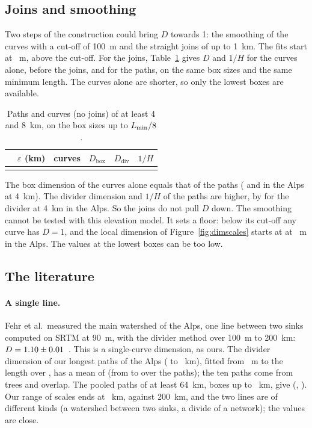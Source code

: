 \subsection{Joins and smoothing}

Two steps of the construction could bring $D$ towards 1: the smoothing of the curves with a cut-off of 100~m and the straight joins of up to 1~km. The fits start at \DmEpsMin~m, above the cut-off. For the joins, Table~\ref{tab:dimcurves}
gives $D$ and $1/H$ for the curves alone, before the joins, and for the paths, on the same box sizes and the same minimum length. The curves alone are shorter, so only the lowest boxes are available.

\begin{table}[H]
\centering
\caption{Paths and curves (no joins) of at least 4 and 8~km, on the box sizes up to $L_{\min}/8$.}
\label{tab:dimcurves}
\footnotesize
\setlength{\tabcolsep}{3pt}
\begin{tabular}{llcccc}
\toprule
 & $\varepsilon$ (km) & curves & $D_{\mathrm{box}}$ & $D_{\mathrm{div}}$ & $1/H$ \\
\midrule
\\
\bottomrule
\end{tabular}
\end{table}

The box dimension of the curves alone equals that of the paths (\DmJnAlpsFourCurvesBox{} and \DmJnAlpsFourPathsBox{} in the Alps at 4~km). The divider dimension and $1/H$ of the paths are higher, by \DmJnAlpsFourDivGap{} for the divider at
4~km in the Alps. So the joins do not pull $D$ down. The smoothing cannot be tested with this elevation model. It sets a floor: below its cut-off any curve has $D=1$, and the local dimension of Figure~\ref{fig:dimscales} starts at
\DmLocAlpsCrBoxLo{} at \DmEpsMin~m in the Alps. The values at the lowest boxes can be too low.

\subsection{The literature}

\paragraph{A single line.} Fehr et al.\ measured the main watershed of the Alps, one line between two sinks computed on SRTM at 90~m, with the divider method over 100~m to 200~km: $D=1.10\pm0.01$~\cite{fehr}. This is a single-curve
dimension, as ours. The divider dimension of our \DmNLongest{} longest paths of the Alps (\DmLongAlpsLenMinKm{} to \DmLongAlpsLenMaxKm~km), fitted from \DmEpsMin~m to the length over \DmRatio, has a mean of \DmLongAlpsDivMean{} (from \DmLongAlpsDivMin{}
to \DmLongAlpsDivMax{} over the paths); the ten paths come from \DmLongAlpsTrees{} trees and overlap. The pooled paths of at least 64~km, boxes up to \DmPoolAlpsEpsHiKm~km, give \DmPoolAlpsDiv{} (\DmPoolAlpsDivLo, \DmPoolAlpsDivHi).
Our range of scales ends at \DmLongAlpsEpsHiKm~km, against 200~km, and the two lines are of different kinds (a watershed between two sinks, a divide of a network); the values are close.

